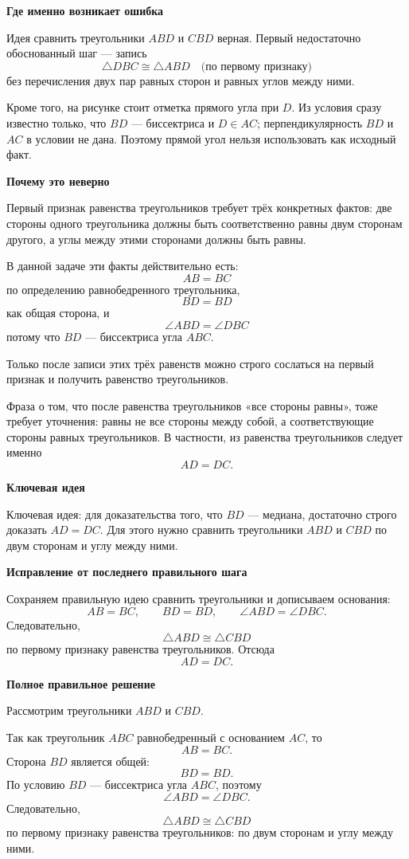 \documentclass[12pt,a4paper]{article}
\newcommand{\keyidea}[1]{\textcolor{blue!60!black}{Ключевая идея:} #1}
\newcommand{\subhead}[1]{\vspace{0.3em}\textbf{#1}\par}
\begin{document}
\subhead{Где именно возникает ошибка}
Идея сравнить треугольники $ABD$ и $CBD$ верная.
Первый недостаточно обоснованный шаг --- запись
\[
\triangle DBC\cong\triangle ABD
\quad \text{(по первому признаку)}
\]
без перечисления двух пар равных сторон и равных углов между ними.

Кроме того, на рисунке стоит отметка прямого угла при $D$.
Из условия сразу известно только, что $BD$ --- биссектриса и $D\in AC$;
перпендикулярность $BD$ и $AC$ в условии не дана.
Поэтому прямой угол нельзя использовать как исходный факт.

\subhead{Почему это неверно}
Первый признак равенства треугольников требует трёх конкретных фактов:
две стороны одного треугольника должны быть соответственно равны двум
сторонам другого, а углы между этими сторонами должны быть равны.

В данной задаче эти факты действительно есть:
\[
AB=BC
\]
по определению равнобедренного треугольника,
\[
BD=BD
\]
как общая сторона, и
\[
\angle ABD=\angle DBC
\]
потому что $BD$ --- биссектриса угла $ABC$.

Только после записи этих трёх равенств можно строго сослаться
на первый признак и получить равенство треугольников.

Фраза о том, что после равенства треугольников «все стороны равны»,
тоже требует уточнения: равны не все стороны между собой,
а соответствующие стороны равных треугольников.
В частности, из равенства треугольников следует именно
\[
AD=DC.
\]

\subhead{Ключевая идея}
\keyidea{для доказательства того, что $BD$ --- медиана,
достаточно строго доказать $AD=DC$.
Для этого нужно сравнить треугольники $ABD$ и $CBD$
по двум сторонам и углу между ними.}

\subhead{Исправление от последнего правильного шага}
Сохраняем правильную идею сравнить треугольники и дописываем основания:
\[
AB=BC,\qquad BD=BD,\qquad \angle ABD=\angle DBC.
\]
Следовательно,
\[
\triangle ABD\cong\triangle CBD
\]
по первому признаку равенства треугольников.
Отсюда
\[
AD=DC.
\]

\subhead{Полное правильное решение}
Рассмотрим треугольники $ABD$ и $CBD$.

Так как треугольник $ABC$ равнобедренный с основанием $AC$, то
\[
AB=BC.
\]
Сторона $BD$ является общей:
\[
BD=BD.
\]
По условию $BD$ --- биссектриса угла $ABC$, поэтому
\[
\angle ABD=\angle DBC.
\]
Следовательно,
\[
\triangle ABD\cong\triangle CBD
\]
по первому признаку равенства треугольников:
по двум сторонам и углу между ними.
\end{document}
